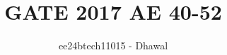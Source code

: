 \documentclass[journal]{IEEEtran}
\begin{document}

\vspace{3cm}


\title{GATE 2017 AE 40-52}
\author{ee24btech11015 - Dhawal}
\maketitle
{\let\newpage\relax\maketitle}

\renewcommand{\thefigure}{\theenumi}
\renewcommand{\thetable}{\theenumi}
\setlength{\intextsep}{10pt} %
\end{document}

